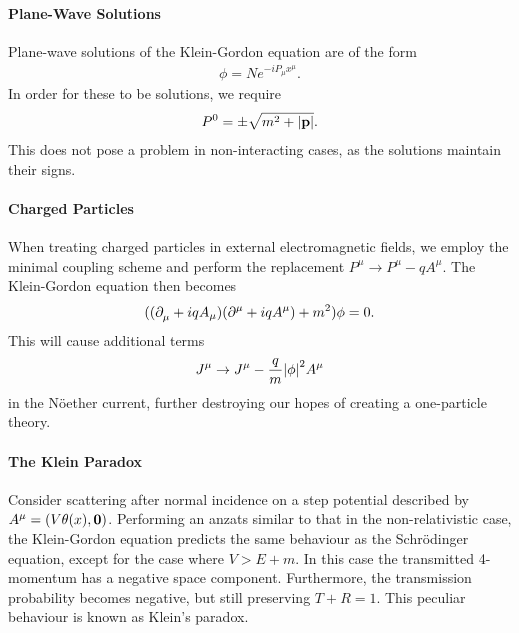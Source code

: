 \paragraph{Plane-Wave Solutions}
Plane-wave solutions of the Klein-Gordon equation are of the form
\begin{align*}
	\phi = Ne^{-iP_{\mu}x^{\mu}}.
\end{align*}
In order for these to be solutions, we require
\begin{align*}
	P^{0} = \pm\sqrt{m^{2} + \abs{\vb{p}}}.
\end{align*}
This does not pose a problem in non-interacting cases, as the solutions maintain their signs.

\paragraph{Charged Particles}
When treating charged particles in external electromagnetic fields, we employ the minimal coupling scheme and perform the replacement $P^{\mu}\to P^{\mu} - qA^{\mu}$. The Klein-Gordon equation then becomes
\begin{align*}
	((\partial^{}_{\mu}{} + iqA_{\mu})(\partial^{\mu}_{}{} + iqA^{\mu}) + m^{2})\phi = 0.
\end{align*}
This will cause additional terms
\begin{align*}
	J^{\mu} \to J^{\mu} - \frac{q}{m}\abs{\phi}^{2}A^{\mu}
\end{align*}
in the Nöether current, further destroying our hopes of creating a one-particle theory.

\paragraph{The Klein Paradox}
Consider scattering after normal incidence on a step potential described by $A^{\mu} = (V\theta(x), \vb{0})$. Performing an anzats similar to that in the non-relativistic case, the Klein-Gordon equation predicts the same behaviour as the Schrödinger equation, except for the case where $V > E + m$. In this case the transmitted 4-momentum has a negative space component. Furthermore, the transmission probability becomes negative, but still preserving $T + R = 1$. This peculiar behaviour is known as Klein's paradox.


